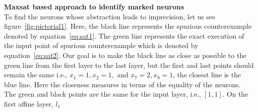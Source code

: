 \noindent\textbf{Maxsat based approach to identify marked neurons}\\
To find the neurons whose abstraction leads to imprecision, let us see figure~\ref{fig:pictorial1}. 
Here, the black line represents the spurious counterexample denoted by equation~\ref{eq:sat1}. 
The green line represents the exact execution of the input point of spurious counterexample 
which is denoted by equation~\ref{eq:sat2}. 
Our goal is to make the black line as close as possible to the green line from the first layer to the last layer, but the 
first and last points should remain the same i.e., $x_1=1,x_2=1,$ and $x_7=2, x_8=1$, the closest line is the blue line.
Here the closeness measures in terms of the equality of the neurons. 
The green and black points are the same for the input layer, i.e., $[1,1]$. On the first affine layer, $l_1$ 
